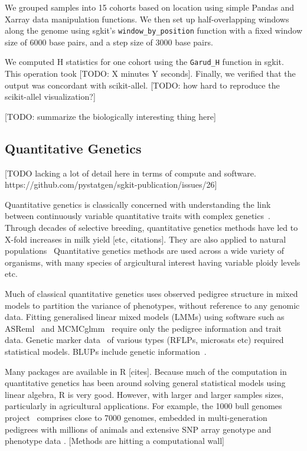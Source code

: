 \documentclass[a4paper,num-refs]{oup-contemporary}
\newcommand{\sgapi}[1]{\texttt{#1}}
\begin{document}
We grouped samples into 15 cohorts based on location using simple Pandas and
Xarray data manipulation functions. We then set up half-overlapping windows
along the genome using sgkit's \sgapi{window\_by\_position} function with a fixed
window size of 6000 base pairs, and a step size of 3000 base pairs.

We computed H statistics for one cohort using the \sgapi{Garud\_H} function in sgkit.
This operation took [TODO: X minutes Y seconds]. Finally, we verified that the
output was concordant with scikit-allel. [TODO: how hard to reproduce the
scikit-allel visualization?]

[TODO: summarize the biologically interesting thing here]

\subsection{Quantitative Genetics}
[TODO lacking a lot of detail here in terms of compute and software.
https://github.com/pystatgen/sgkit-publication/issues/26]

Quantitative genetics is classically concerned with understanding
the link between continuously variable quantitative traits
with complex genetics~\citep{hill2010understanding}.
Through decades of selective breeding, quantitative genetics methods have
led to X-fold increases in milk yield [etc, citations].
They are also applied to
natural populations~\citep{wilson2010ecologist}
Quantitative genetics methods are used across a wide variety of
organisms, with many species of argicultural interest having
variable ploidy levels etc.

Much of classical quantitative genetics uses observed pedigree structure
in mixed models to partition the variance of phenotypes, without
reference to any genomic data.
Fitting generalised linear mixed models (LMMs) using
software such as ASReml~\citep{butler2009asreml}
and MCMCglmm~\citep{hadfield2010mcmc} require only the pedigree
information and trait data.
Genetic marker data~\citep{bernardo2008molecular} of various
types (RFLPs, microsats etc) required statistical models.
BLUPs include genetic information~\citep{endelman2011ridge}.

Many packages are available in R [cites]. Because much of the computation
in quantitative genetics has been around solving
general statistical models using linear algebra, R is very good.
However, with larger and larger samples sizes, particularly
in agricultural applications.
For example,
the 1000 bull genomes project~\citep{hayes20191000}
comprises close to 7000 genomes, embedded in multi-generation pedigrees
with millions of animals and extensive SNP array genotype and phenotype
data \citep[e.g.][]{cesarani2022mulibreed}.
[Methods are hitting a computational wall]
\end{document}
